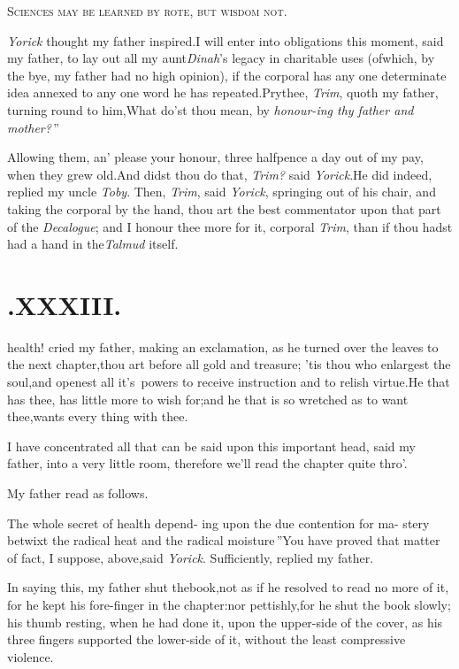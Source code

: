 \documentclass{article}
\begin{document}
\tsk \textsc{Sciences may be learned by rote, but wisdom not}.


\textit{Yorick} thought my father inspired.\tsk I will enter into obligations
this moment, said my father, to lay out all my aunt\break \textit{Dinah}’s legacy
in charitable uses (of\break which, by the bye, my father had no high opinion), if
the corporal has any one determinate idea annexed to any one word he has
repeated.\tsk Prythee, \textit{Trim}, quoth my father, turning round to
him,\break\tsk What do’st thou mean, by
\lqq\textit{honour-\break\lqq ing thy father and mother?}\,”


Allowing them, an’ please your ho\-nour, three halfpence a
day out of my pay, when they grew old.\tsk And didst thou do
that, \textit{Trim?} said \textit{Yorick}.\tsk He did indeed, replied
my uncle \textit{Toby}.\tsk\break
Then, \textit{Trim}, said \textit{Yorick}, springing out\break
of his chair, and taking the corporal by\break
the hand, thou art the best commentator upon that part of the
\textit{Decalogue}; and I honour thee more for it, corporal \textit{Trim}, than
if thou hadst had a hand in the\break\textit{Talmud} itself.

\section{.\enspace  XXXIII.}

 health! cried my father,
making an exclamation, as he\break
turned over the leaves to the next
chapter,\tsk thou art before all gold and treasure; ’tis thou who
enlargest the soul,\tsk and openest all it’s\sic\ powers to receive
instruction and to relish virtue.\tsk He that has thee, has
little more to wish for;\tsk and he that is so wretched as to
want thee,\tsk wants every thing with thee.\etp

I have concentrated all that can be said upon this important
head, said my father, into a very little room, therefore
we’ll read the chapter quite thro’.

My father read as follows.

\indent\lqq The whole secret of health depend-\break
\lqq ing upon the due contention for ma-\break
\lqq stery betwixt the radical heat and the\break
\lqq radical moisture\,”\tsk You have proved
that matter of fact, I suppose, above,\break said \textit{Yorick}. Sufficiently,
replied my father.


In saying this, my father shut the\break book,\tsk not as if he resolved to read no
more of it, for he kept his fore-finger in the chapter:\tsh nor pettishly,\tsk for
he shut the book slowly; his thumb resting, when he had done it, upon the upper-side
of the cover, as his three fingers supported the lower-side of it, without the least
compressive violence.\tsh{}
\end{document}
